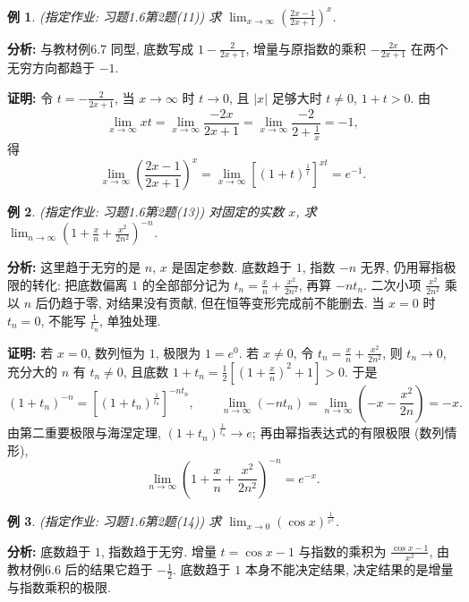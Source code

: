 \documentclass[UTF8,openany]{ctexbook}
\theoremstyle{chinesetextbook}
\newtheorem{example}{例}[section]
\newenvironment{cnproof}{\par\indent\textbf{证明:} \ignorespaces}{\par}
\begin{document}
\begin{example}
\textnormal{(指定作业: 习题1.6第2题(11))} 求 $\displaystyle \lim_{x\to\infty}\left(\frac{2x-1}{2x+1}\right)^x$.
\end{example}
\par\indent\textbf{分析:} 与教材例6.7 同型, 底数写成 $\displaystyle1-\frac2{2x+1}$, 增量与原指数的乘积 $\displaystyle-\frac{2x}{2x+1}$ 在两个无穷方向都趋于 $-1$.
\begin{cnproof}
令 $\displaystyle t=-\frac2{2x+1}$, 当 $x\to\infty$ 时 $t\to0$, 且 $|x|$ 足够大时 $t\ne0$, $1+t>0$. 由
\[
\lim_{x\to\infty}xt=\lim_{x\to\infty}\frac{-2x}{2x+1}=\lim_{x\to\infty}\frac{-2}{2+\frac1x}=-1,
\]
得
\[
\lim_{x\to\infty}\left(\frac{2x-1}{2x+1}\right)^x
=\lim_{x\to\infty}\left[(1+t)^{\frac1t}\right]^{xt}=e^{-1}.
\]
\end{cnproof}
\begin{example}
\textnormal{(指定作业: 习题1.6第2题(13))} 对固定的实数 $x$, 求 $\displaystyle \lim_{n\to\infty}\left(1+\frac xn+\frac{x^2}{2n^2}\right)^{-n}$.
\end{example}
\par\indent\textbf{分析:} 这里趋于无穷的是 $n$, $x$ 是固定参数. 底数趋于 $1$, 指数 $-n$ 无界, 仍用幂指极限的转化: 把底数偏离 $1$ 的全部部分记为 $\displaystyle t_n=\frac xn+\frac{x^2}{2n^2}$, 再算 $-nt_n$. 二次小项 $\displaystyle\frac{x^2}{2n^2}$ 乘以 $n$ 后仍趋于零, 对结果没有贡献, 但在恒等变形完成前不能删去. 当 $x=0$ 时 $t_n=0$, 不能写 $\displaystyle\frac1{t_n}$, 单独处理.
\begin{cnproof}
若 $x=0$, 数列恒为 $1$, 极限为 $1=e^{0}$. 若 $x\ne0$, 令 $\displaystyle t_n=\frac xn+\frac{x^2}{2n^2}$, 则 $t_n\to0$, 充分大的 $n$ 有 $t_n\ne0$, 且底数 $\displaystyle1+t_n=\frac12\left[\left(1+\frac xn\right)^2+1\right]>0$. 于是
\[
\left(1+t_n\right)^{-n}=\left[(1+t_n)^{\frac1{t_n}}\right]^{-nt_n},
\qquad
\lim_{n\to\infty}(-nt_n)=\lim_{n\to\infty}\left(-x-\frac{x^2}{2n}\right)=-x.
\]
由第二重要极限与海涅定理, $(1+t_n)^{\frac1{t_n}}\to e$; 再由幂指表达式的有限极限 (数列情形),
\[
\lim_{n\to\infty}\left(1+\frac xn+\frac{x^2}{2n^2}\right)^{-n}=e^{-x}.
\]
\end{cnproof}
\begin{example}
\textnormal{(指定作业: 习题1.6第2题(14))} 求 $\displaystyle \lim_{x\to0}(\cos x)^{\frac1{x^2}}$.
\end{example}
\par\indent\textbf{分析:} 底数趋于 $1$, 指数趋于无穷. 增量 $t=\cos x-1$ 与指数的乘积为 $\displaystyle\frac{\cos x-1}{x^2}$, 由教材例6.6 后的结果它趋于 $\displaystyle-\frac12$. 底数趋于 $1$ 本身不能决定结果, 决定结果的是增量与指数乘积的极限.
\end{document}
